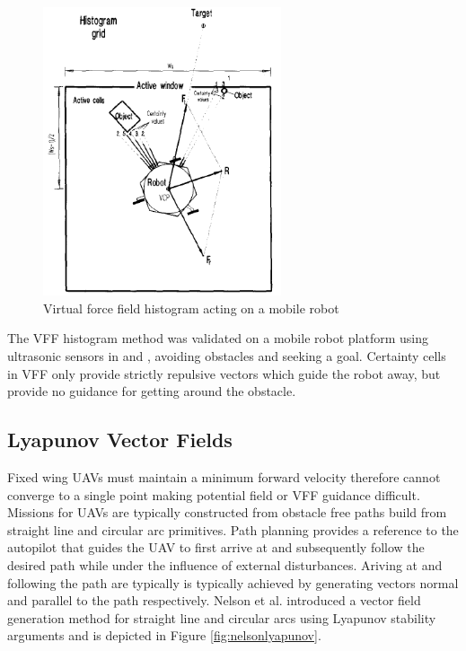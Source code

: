 \documentclass[numbered,pdftex]{ohio-etd}
\begin{document}
\begin{figure}
	\centering
	\includegraphics[width=7cm]{PaperFigures/histogram}
	\caption{Virtual force field histogram acting on a mobile robot}
	\label{fig:histogram}
\end{figure}


The VFF histogram method was validated on a mobile robot platform using ultrasonic sensors in \cite{borenstein_real-time_1990} and \cite{borenstein_vector_1991}, avoiding obstacles and seeking a goal. Certainty cells in VFF only provide strictly repulsive vectors which guide the robot away, but provide no guidance for getting around the obstacle. 
 
 
 
 
 
 
 
\subsection{Lyapunov Vector Fields}

Fixed wing UAVs must maintain a minimum forward velocity therefore cannot converge to a single point making potential field or VFF guidance difficult. Missions for UAVs are typically constructed from obstacle free paths build from straight line and circular arc primitives. Path planning provides a reference to the autopilot that guides the UAV to first arrive at and subsequently follow the desired path while under the influence of external disturbances. 
Ariving at and following the path are typically is typically achieved by generating vectors normal and parallel to the path respectively. Nelson et al. introduced a vector field generation method for straight line and circular arcs using Lyapunov stability arguments \cite{nelson_cooperative_2005} and is depicted in Figure \ref{fig:nelsonlyapunov}.
\end{document}
